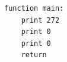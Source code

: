 \begin{lstlisting}[]
function main:
    print 272
    print 0
    print 0
    return
\end{lstlisting}
